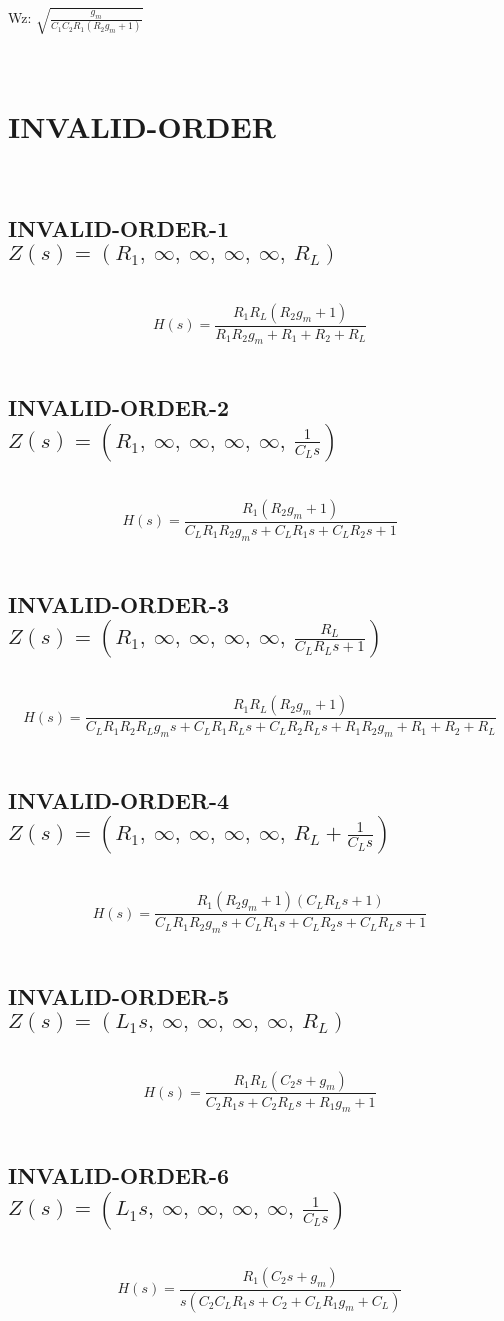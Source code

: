 \documentclass{article}
\begin{document}
Wz: $\sqrt{\frac{g_{m}}{C_{1} C_{2} R_{1} \left(R_{2} g_{m} + 1\right)}}$\ 

\ 

\section{INVALID-ORDER}\ 
\subsection{INVALID-ORDER-1 $Z(s) = \left( R_{1}, \  \infty, \  \infty, \  \infty, \  \infty, \  R_{L}\right)$ } \ 
\textbf{\[H(s) = \frac{R_{1} R_{L} \left(R_{2} g_{m} + 1\right)}{R_{1} R_{2} g_{m} + R_{1} + R_{2} + R_{L}}\] } \ 
\subsection{INVALID-ORDER-2 $Z(s) = \left( R_{1}, \  \infty, \  \infty, \  \infty, \  \infty, \  \frac{1}{C_{L} s}\right)$ } \ 
\textbf{\[H(s) = \frac{R_{1} \left(R_{2} g_{m} + 1\right)}{C_{L} R_{1} R_{2} g_{m} s + C_{L} R_{1} s + C_{L} R_{2} s + 1}\] } \ 
\subsection{INVALID-ORDER-3 $Z(s) = \left( R_{1}, \  \infty, \  \infty, \  \infty, \  \infty, \  \frac{R_{L}}{C_{L} R_{L} s + 1}\right)$ } \ 
\textbf{\[H(s) = \frac{R_{1} R_{L} \left(R_{2} g_{m} + 1\right)}{C_{L} R_{1} R_{2} R_{L} g_{m} s + C_{L} R_{1} R_{L} s + C_{L} R_{2} R_{L} s + R_{1} R_{2} g_{m} + R_{1} + R_{2} + R_{L}}\] } \ 
\subsection{INVALID-ORDER-4 $Z(s) = \left( R_{1}, \  \infty, \  \infty, \  \infty, \  \infty, \  R_{L} + \frac{1}{C_{L} s}\right)$ } \ 
\textbf{\[H(s) = \frac{R_{1} \left(R_{2} g_{m} + 1\right) \left(C_{L} R_{L} s + 1\right)}{C_{L} R_{1} R_{2} g_{m} s + C_{L} R_{1} s + C_{L} R_{2} s + C_{L} R_{L} s + 1}\] } \ 
\subsection{INVALID-ORDER-5 $Z(s) = \left( L_{1} s, \  \infty, \  \infty, \  \infty, \  \infty, \  R_{L}\right)$ } \ 
\textbf{\[H(s) = \frac{R_{1} R_{L} \left(C_{2} s + g_{m}\right)}{C_{2} R_{1} s + C_{2} R_{L} s + R_{1} g_{m} + 1}\] } \ 
\subsection{INVALID-ORDER-6 $Z(s) = \left( L_{1} s, \  \infty, \  \infty, \  \infty, \  \infty, \  \frac{1}{C_{L} s}\right)$ } \ 
\textbf{\[H(s) = \frac{R_{1} \left(C_{2} s + g_{m}\right)}{s \left(C_{2} C_{L} R_{1} s + C_{2} + C_{L} R_{1} g_{m} + C_{L}\right)}\] } \ 
\end{document}
